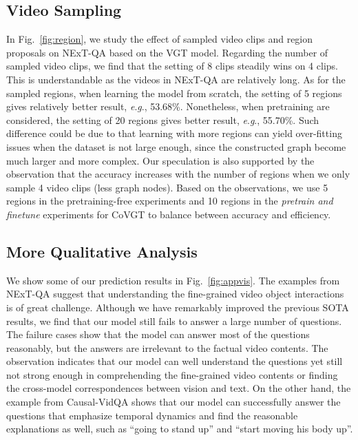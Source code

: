 \documentclass[10pt,journal,compsoc]{IEEEtran}
\newcommand{\eg}{\textit{e}.\textit{g}.}
\begin{document}
\subsection{Video Sampling}
\label{app:vsp}
In Fig.~\ref{fig:region}, we study the effect of sampled video clips and region proposals on NExT-QA \cite{xiao2021next} based on the VGT model. Regarding the number of sampled video clips, we find that the setting of 8 clips steadily wins on 4 clips. This is understandable as the videos in NExT-QA are relatively long. As for the sampled regions, when learning the model from scratch, the setting of 5 regions gives relatively better result, \eg, 53.68\%. Nonetheless, when pretraining are considered, the setting of 20 regions gives better result, \eg, 55.70\%. Such difference could be due to that learning with more regions can yield over-fitting issues when the dataset is not large enough, since the constructed graph become much larger and more complex. Our speculation is also supported by the observation that the accuracy increases with the number of regions when we only sample 4 video clips (less graph nodes). Based on the observations, we use 5 regions in the pretraining-free experiments and 10 regions in the \emph{pretrain and finetune} experiments for CoVGT to balance between accuracy and efficiency. 
\subsection{More Qualitative Analysis}
\label{app:qua_res}
We show some of our prediction results in Fig.~\ref{fig:appvis}. The examples from NExT-QA suggest that understanding the fine-grained video object interactions is of great challenge. Although we have remarkably improved the previous SOTA results, we find that our model still fails to answer a large number of questions. The failure cases show that the model can answer most of the questions reasonably, but the answers are irrelevant to the factual video contents. The observation indicates that our model can well understand the questions yet still not strong enough in comprehending the fine-grained video contents or finding the cross-model correspondences between vision and text. On the other hand, the example from Causal-VidQA shows that our model can successfully answer the questions that emphasize temporal dynamics and find the reasonable explanations as well, such as ``going to stand up'' and ``start moving his body up''.  
\end{document}
